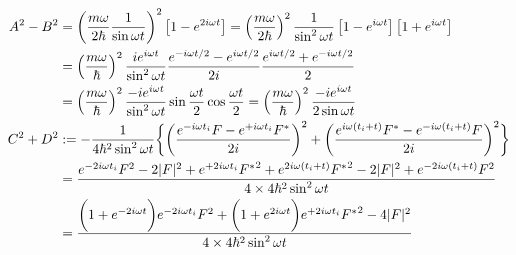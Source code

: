 \begin{subequations}
\begin{align}
    A^2 - B^2
    &=
    \left(
        \dfrac{m \omega}{2 \hbar}
        \dfrac{1}{\sin \omega t}
    \right)^2
    \left[
        1
        - e^{2 i \omega t}
    \right]
=
    \left(
        \dfrac{m \omega}{2 \hbar}
    \right)^2
    \dfrac{1}{\sin^2 \omega t}
    \left[
        1
    -
        e^{i \omega t}
    \right]
    \left[
        1
    +
        e^{i \omega t}
    \right]
\notag\\&=
    \left(
        \dfrac{m \omega}{\hbar}
    \right)^2
    \dfrac{
        i
        e^{i \omega t}
    }{\sin^2 \omega t}
    \dfrac{
            e^{- i \omega t/2}
        -
            e^{  i \omega t/2}
    }{2 i}
    \dfrac{
        e^{i \omega t/2}
    +
        e^{- i \omega t/2}
    }{2}
\notag\\&=
    \left(
        \dfrac{m \omega}{\hbar}
    \right)^2
    \dfrac{
    -
        i
        e^{i \omega t}
    }{\sin^2 \omega t}
    \sin \dfrac{\omega t}{2}
    \cos \dfrac{\omega t}{2}
=
    \left(
        \dfrac{m \omega}{\hbar}
    \right)^2
    \dfrac{
    -
        i
        e^{i \omega t}
    }{2 \sin \omega t}
\\
    C^2 + D^2
&:=
    -
    \dfrac{1}{4 \hbar^2 \sin^2 \omega t}
    \bigg\{
        \bigg(
            \dfrac{
            e^{- i \omega t_i}
                F
        -
            e^{+ i \omega t_i}
                F^*
        }{ 2i }
        \bigg)^2
    +
        \bigg(
            \dfrac{
            e^{i \omega (t_i + t)}
                F^*
        -
            e^{- i \omega (t_i + t)}
                F
        }{ 2i }
        \bigg)^2
    \bigg\}
\notag\\&
    =
    \dfrac{
            e^{- 2 i \omega t_i}
                F^2
        -
            2 | F |^2
        +
            e^{+ 2 i \omega t_i}
                {F^*}^2
    +
            e^{2 i \omega (t_i + t)}
                {F^*}^2
        -
            2 | F |^2
        +
            e^{- 2 i \omega (t_i + t)}
                F^2
    }{4 \times 4 \hbar^2 \sin^2 \omega t}
\notag\\&
    =
    \dfrac{
        \bigg(
            1
        +
            e^{- 2 i \omega t}
        \bigg) 
        e^{- 2 i \omega t_i}
            F^2
    +
        \bigg(
            1
        +
            e^{2 i \omega t}
        \bigg) 
        e^{+ 2 i \omega t_i}
            {F^*}^2
    -
        4 | F |^2
    }{4 \times 4 \hbar^2 \sin^2 \omega t}
\\

\end{align}
\end{subequations}
